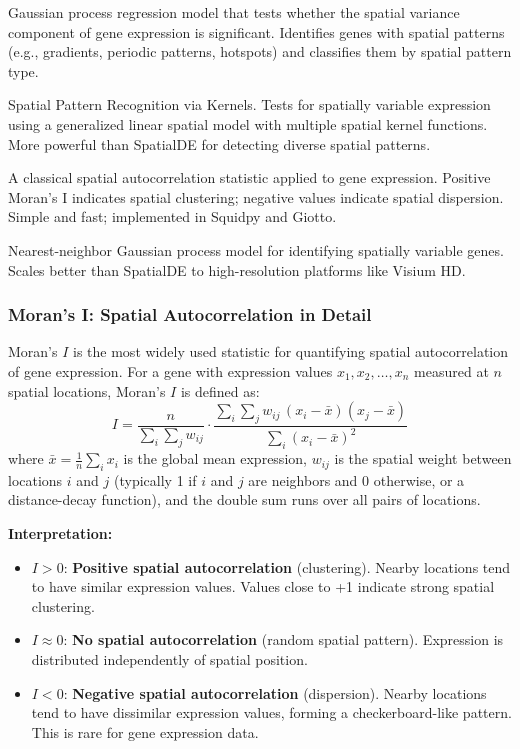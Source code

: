 \begin{description}[style=nextline]
  \item[\software{SpatialDE}] Gaussian process regression model that tests
    whether the spatial variance component of gene expression is significant.
    Identifies genes with spatial patterns (e.g., gradients, periodic patterns,
    hotspots) and classifies them by spatial pattern type.
  \item[\software{SPARK}] Spatial Pattern Recognition via Kernels. Tests for
    spatially variable expression using a generalized linear spatial model with
    multiple spatial kernel functions. More powerful than SpatialDE for
    detecting diverse spatial patterns.
  \item[\software{Moran's I}] A classical spatial autocorrelation statistic
    applied to gene expression. Positive Moran's I indicates spatial clustering;
    negative values indicate spatial dispersion. Simple and fast; implemented in
    Squidpy and Giotto.
  \item[\software{nnSVG}] Nearest-neighbor Gaussian process model for
    identifying spatially variable genes. Scales better than SpatialDE to
    high-resolution platforms like Visium HD.
\end{description}

\subsubsection{Moran's I: Spatial Autocorrelation in Detail}
\label{subsec:spatial:morans_i}

Moran's $I$ is the most widely used statistic for quantifying spatial
autocorrelation of gene expression. For a gene with expression values
$x_1, x_2, \ldots, x_n$ measured at $n$ spatial locations, Moran's $I$ is
defined as:
\begin{equation}
  \label{eq:spatial:morans_i}
  I = \frac{n}{\sum_{i} \sum_{j} w_{ij}}
    \cdot
    \frac{\sum_{i} \sum_{j} w_{ij}\,(x_i - \bar{x})(x_j - \bar{x})}
         {\sum_{i} (x_i - \bar{x})^2}
\end{equation}
where $\bar{x} = \frac{1}{n}\sum_i x_i$ is the global mean expression,
$w_{ij}$ is the spatial weight between locations $i$ and $j$ (typically 1 if
$i$ and $j$ are neighbors and 0 otherwise, or a distance-decay function), and
the double sum runs over all pairs of locations.

\textbf{Interpretation:}
\begin{itemize}[nosep]
  \item $I > 0$: \textbf{Positive spatial autocorrelation} (clustering).
    Nearby locations tend to have similar expression values. Values close to
    +1 indicate strong spatial clustering.
  \item $I \approx 0$: \textbf{No spatial autocorrelation} (random spatial
    pattern). Expression is distributed independently of spatial position.
  \item $I < 0$: \textbf{Negative spatial autocorrelation} (dispersion).
    Nearby locations tend to have dissimilar expression values, forming a
    checkerboard-like pattern. This is rare for gene expression data.
\end{itemize}

